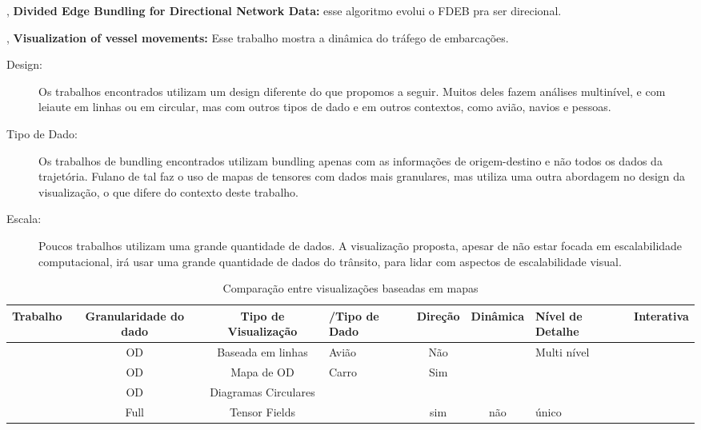   \citet{Selassie2011}, \textbf{Divided Edge Bundling for Directional Network
Data:} esse algoritmo evolui o FDEB pra ser direcional.

  \citet{Willems2009}, \textbf{Visualization of vessel movements:} Esse trabalho mostra a dinâmica do tráfego de embarcações. 


\begin{description}
  \item[Design:] Os trabalhos encontrados utilizam um design diferente do que propomos a seguir.
  Muitos deles fazem análises multinível, e com leiaute em linhas ou em circular, mas com outros tipos de dado
  e em outros contextos, como avião, navios e pessoas.

  \item[Tipo de Dado:] Os trabalhos de bundling encontrados utilizam bundling
  apenas com as informações de origem-destino e não todos os dados da trajetória.
  Fulano de tal faz o uso de mapas de tensores com dados mais granulares, mas
  utiliza uma outra abordagem no design da visualização, o que difere do contexto
  deste trabalho.

  \item[Escala:] Poucos trabalhos utilizam uma grande quantidade de dados. A visualização
  proposta, apesar de não estar focada em escalabilidade computacional, irá usar
  uma grande quantidade de dados do trânsito, para lidar com aspectos de escalabilidade
  visual.
\end{description}

\begin{table}[]
\caption{Comparação entre visualizações baseadas em mapas}
\begin{tabular}{|c|c|c|l|c|c|l|l|}
\hline
\textbf{Trabalho} & \textbf{Granularidade do dado} & \textbf{Tipo de Visualização} & /Tipo de Dado & \textbf{Direção} & \textbf{Dinâmica} & Nível de Detalhe & Interativa \\ \hline
                  & OD                             & Baseada em linhas             & Avião         & Não              &                   & Multi nível      &            \\ \hline
                  & OD                             & Mapa de OD                    & Carro         & Sim              &                   &                  &            \\ \hline
                  & OD                             & Diagramas Circulares          &               &                  &                   &                  &            \\ \hline
                  & Full                           & Tensor Fields                 &               & sim              & não               & único            &            \\ \hline
\end{tabular}
\end{table}

